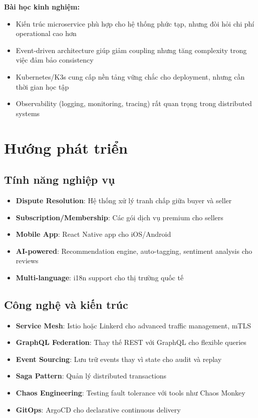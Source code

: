 \documentclass[12pt]{extreport}
\begin{document}
\textbf{Bài học kinh nghiệm:}
\begin{itemize}
    \item Kiến trúc microservice phù hợp cho hệ thống phức tạp, nhưng đòi hỏi chi phí operational cao hơn
    \item Event-driven architecture giúp giảm coupling nhưng tăng complexity trong việc đảm bảo consistency
    \item Kubernetes/K3s cung cấp nền tảng vững chắc cho deployment, nhưng cần thời gian học tập
    \item Observability (logging, monitoring, tracing) rất quan trọng trong distributed systems
\end{itemize}

\section{Hướng phát triển}

\subsection{Tính năng nghiệp vụ}

\begin{itemize}
    \item \textbf{Dispute Resolution}: Hệ thống xử lý tranh chấp giữa buyer và seller
    \item \textbf{Subscription/Membership}: Các gói dịch vụ premium cho sellers
    \item \textbf{Mobile App}: React Native app cho iOS/Android
    \item \textbf{AI-powered}: Recommendation engine, auto-tagging, sentiment analysis cho reviews
    \item \textbf{Multi-language}: i18n support cho thị trường quốc tế
\end{itemize}

\subsection{Công nghệ và kiến trúc}

\begin{itemize}
    \item \textbf{Service Mesh}: Istio hoặc Linkerd cho advanced traffic management, mTLS
    \item \textbf{GraphQL Federation}: Thay thế REST với GraphQL cho flexible queries
    \item \textbf{Event Sourcing}: Lưu trữ events thay vì state cho audit và replay
    \item \textbf{Saga Pattern}: Quản lý distributed transactions
    \item \textbf{Chaos Engineering}: Testing fault tolerance với tools như Chaos Monkey
    \item \textbf{GitOps}: ArgoCD cho declarative continuous delivery
\end{itemize}
\end{document}
